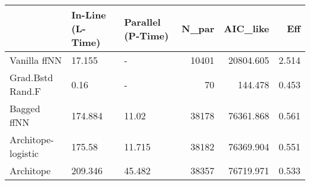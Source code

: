 \begin{tabular}{lllrrr}
\toprule
{} & In-Line (L-Time) & Parallel (P-Time) &  N\_par &   AIC\_like &    Eff \\
\midrule
Vanilla ffNN       &           17.155 &                 - &  10401 &  20804.605 &  2.514 \\
Grad.Bstd Rand.F   &             0.16 &                 - &     70 &    144.478 &  0.453 \\
Bagged ffNN        &          174.884 &             11.02 &  38178 &  76361.868 &  0.561 \\
Architope-logistic &           175.58 &            11.715 &  38182 &  76369.904 &  0.551 \\
Architope          &          209.346 &            45.482 &  38357 &  76719.971 &  0.533 \\
\bottomrule
\end{tabular}
